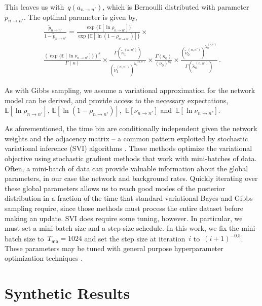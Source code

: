 This leaves us with~$q(a_{n \to n'})$, which is Bernoulli distributed
with parameter~$\widetilde{p}_{n \to n'}$. The optimal parameter is given by,
\begin{multline*}
  \frac{\widetilde{p}_{n \to n'}}{1-\widetilde{p}_{n \to n'}} =  
  \frac{\exp\{\mathbb{E} [\ln \rho_{n \to n'}] \} }{\exp\{\mathbb{E}[\ln (1-\rho_{n \to n'})] \}} \times \\
  \frac{ (\exp\{\mathbb{E} [\ln \nu_{n \to n'}] \})^{\kappa} }{ \Gamma(\kappa)} \times 
  \frac{\Gamma(\widetilde{\kappa}^{(n,n')}_1)}{ (\widetilde{\nu}^{(n,n')}_1)^{\widetilde{\kappa}^{(n,n')}_1} } \times
  \frac{\Gamma(\kappa_0)}{ (\nu_0)^{\kappa_0} } \times
  \frac{(\widetilde{\nu}^{(n,n')}_0)^{\widetilde{\kappa}^{(n,n')}_0}}{ \Gamma(\widetilde{\kappa}^{(n,n')}_0)}\,.
\end{multline*}

As with Gibbs sampling, we assume a variational approximation for the
network model can be derived, and provide access to the necessary
expectations,~$\mathbb{E}[\ln \rho_{n \to n'}]$,
$\mathbb{E}[\ln(1-\rho_{n \to n'})]$,~$\mathbb{E}[\nu_{n \to n'}]$ and~$\mathbb{E}[\ln \nu_{n \to n'}]$.

As aforementioned, the time bin are conditionally independent given
the network weights and the adjacency matrix -- a common pattern
exploited by stochastic variational inference (SVI) algorithms
\citep{Hoffman-2013}.  These methods optimize the variational objective
using stochastic gradient methods that work with mini-batches of data.
Often, a mini-batch of data can provide valuable information about the
global parameters, in our case the network and background rates.
Quickly iterating over these global parameters allows us to reach good
modes of the posterior distribution in a fraction of the time that
standard variational Bayes and Gibbs sampling require, since those
methods must process the entire dataset before making an update.  SVI
does require some tuning, however. In particular, we must set a
mini-batch size and a step size schedule.  In this work, we fix the
mini-batch size to~${T_{\mathsf{mb}}=1024}$ and set the step size at
iteration~$i$ to~${(i+1)^{-0.5}}$.  These parameters may be tuned with
general purpose hyperparameter optimization techniques
\citep{Snoek-2012}.

\section{Synthetic Results}

